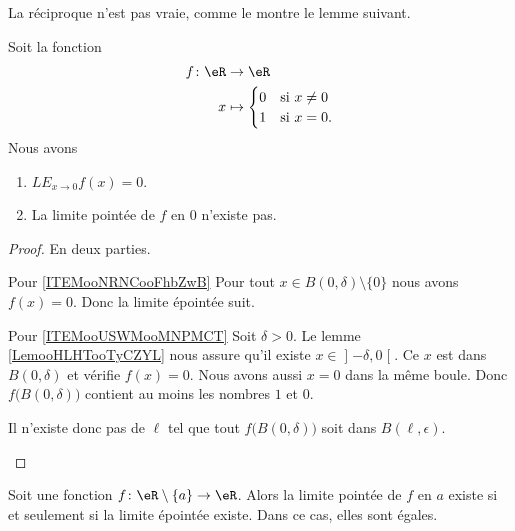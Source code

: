 La réciproque n'est pas vraie, comme le montre le lemme suivant.
\begin{lemma}     \label{LEMooOSNGooJpiXbK}
    Soit la fonction
    \begin{equation}
        \begin{aligned}
            f\colon \eR&\to \eR \\
            x&\mapsto \begin{cases}
                0    &   \text{si } x\neq 0\\
                1    &    \text{si }x=0.
            \end{cases}
        \end{aligned}
    \end{equation}
    Nous avons
    \begin{enumerate}
        \item       \label{ITEMooNRNCooFhbZwB}
            \( {LE}_{x\to 0}f(x)=0\).
        \item       \label{ITEMooUSWMooMNPMCT}
            La limite pointée de \( f\) en \( 0\) n'existe pas.
    \end{enumerate}
\end{lemma}

\begin{proof}
    En deux parties.
    \begin{subproof}
        \item[Pour \ref{ITEMooNRNCooFhbZwB}]
            Pour tout \( x\in B(0,\delta)\setminus\{ 0 \}\) nous avons \( f(x)=0\). Donc la limite épointée suit.
        \item[Pour \ref{ITEMooUSWMooMNPMCT}]
        Soit \( \delta>0\). Le lemme \ref{LemooHLHTooTyCZYL} nous assure qu'il existe \( x\in \mathopen] -\delta , 0 \mathclose[\). Ce \( x\) est dans \( B(0,\delta)\) et vérifie \( f(x)=0\). Nous avons aussi \( x=0\) dans la même boule. Donc \( f\big( B(0,\delta) \big)\) contient au moins les nombres \( 1\) et \( 0\).

            Il n'existe donc pas de \( \ell\) tel que tout \( f\big( B(0,\delta) \big)\) soit dans \( B(\ell, \epsilon)\).
    \end{subproof}
\end{proof}

\begin{lemma}\label{LEMooTPNEooRurTJJ}
    Soit une fonction \( f\colon \eR\setminus\{ a \}\to \eR\). Alors la limite pointée de \( f\) en \( a\) existe si et seulement si la limite épointée existe. Dans ce cas, elles sont égales.
\end{lemma}

